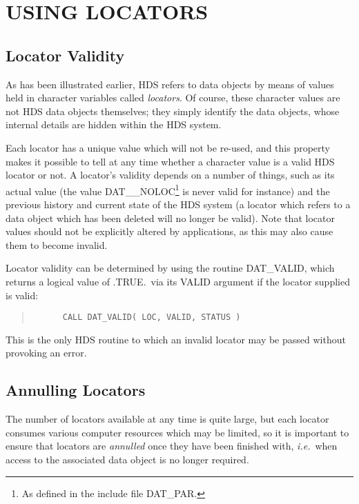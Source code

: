 \documentclass[11pt]{article}
\newcommand{\htmlref}[2]{#1}
\newcommand{\xlabel}[1]{}
\newcommand{\st}[1]{{\em{#1}}}
\begin{document}
\section{\xlabel{using_locators}\label{sect:locators}USING LOCATORS}

\subsection{\xlabel{locator_validity}Locator Validity}

As has been illustrated \htmlref{earlier}{sect:creating}, HDS
refers to data objects by means of values held in character variables
called \st{locators}.  Of course, these character values are not HDS
data objects themselves; they simply identify the data objects, whose
internal details are hidden within the HDS system.

Each locator has a unique value which will not be re-used, and this
property makes it possible to tell at any time whether a character
value is a valid HDS locator or not.  A locator's validity depends on
a number of things, such as its actual value (the value
DAT\_\_NOLOC\footnote{As defined in the include file DAT\_PAR.} is
never valid for instance) and the previous history and current state
of the HDS system (a locator which refers to a data object which has
been deleted will no longer be valid).  Note that locator values
should not be explicitly altered by applications, as this may also
cause them to become invalid.

Locator validity can be determined by using the routine
\htmlref{DAT\_VALID}{DAT_VALID}, which returns a logical value of
.TRUE.\ via its VALID argument if the locator supplied is valid:

\small
\begin{quote}
\begin{verbatim}
      CALL DAT_VALID( LOC, VALID, STATUS )
\end{verbatim}
\end{quote}
\normalsize

This is the only HDS routine to which an invalid locator may be passed
without provoking an error.

\subsection{\xlabel{annulling_locators}\label{sect:annul}Annulling Locators}

The number of locators available at any time is quite large, but each
locator consumes various computer resources which may be limited, so
it is important to ensure that locators are \st{annulled\/} once they
have been finished with, \st{i.e.}\ when access to the associated
data object is no longer required.
\end{document}
